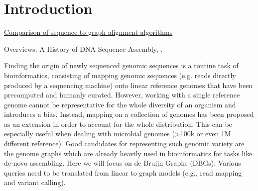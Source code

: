 \section{Introduction}


 \href{https://docs.google.com/spreadsheets/d/1_3dW1zqKXWOqUNWUOfftjB-yKd_oGRbRwgVZOk_aYj8/edit#gid=0}{Comparison of sequence to graph alignment algorithms}

Overviews: A History of DNA Sequence Assembly\cite{myers2016history}, \cite{computational2016pengenomics}.



Finding the origin of newly sequenced genomic sequences is a routine task of bioinformatics, consisting of mapping genomic sequences (e.g. reads directly produced by a sequencing machine) onto linear reference genomes that have been precomputed and humanly curated.
However, working with a single reference genome cannot be representative for the whole diversity of an organism and introduces a bias.
Instead, mapping on a collection of genomes has been proposed as an extension in order to account for the whole distribution.
This can be especially useful when dealing with microbial genomes (>100k or even 1M different reference).
Good candidates for representing such genomic variety are the genome graphs which are already heavily used in bioinformatics for tasks like de-novo assembling.
Here we will focus on de Bruijn Graphs (DBGs).
Various queries need to be translated from linear to graph models (e.g., read mapping and variant calling).

